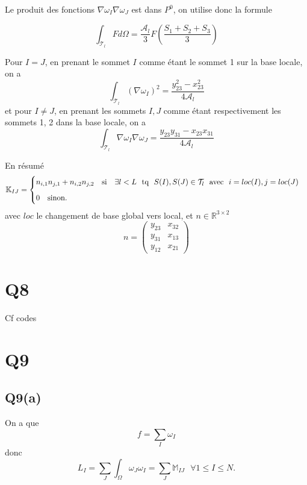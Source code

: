\documentclass[11pt]{article}
\newcommand{\A}{\mathcal{A}}
\newcommand{\R}{\mathbb{R}}
\newcommand{\K}{\mathbb{K}}
\newcommand{\M}{\mathbb{M}}
\newcommand{\ms}{~~~}
\begin{document}
Le produit des fonctions $\nabla \omega_I \nabla \omega_J$ est dans $P^0$, on utilise donc la formule

\begin{equation}
  \int_{\mathcal{T}_l} F d\Omega = \frac{\A_l}{3}F\left(\frac{S_1+S_2+S_3}{3} \right)  
\end{equation}

Pour $I=J$, en prenant le sommet $I$ comme étant le sommet 1 sur la base locale, on a
\begin{equation}
  \int_{\mathcal{T}_l} (\nabla \omega_I)^2 = \frac{y_{23}^2-x_{23}^2}{4\A_l}
\end{equation}
et pour $I\neq J$, en prenant les sommets $I, J$ comme étant respectivement les sommets 1, 2 dans la base locale, on a
\begin{equation}
  \int_{\mathcal{T}_l} \nabla \omega_I \nabla \omega_J = \frac{y_{23}y_{31}-x_{23}x_{31}}{4\A_l}
\end{equation}

En résumé
\begin{equation}
  \K_{IJ} =
  \begin{cases}
    n_{i,1}n_{j,1} + n_{i,2}n_{j,2} \ms \mbox{si} \ms \exists l < L \mbox{~~tq~~} S(I), S(J) \in \mathcal{T}_l \mbox{~~avec~~} i=loc(I), j=loc(J)\medskip\\
    0 \ms \mbox{sinon}.
  \end{cases}
\end{equation}
avec $loc$ le changement de base global vers local, et $n\in\R^{3\times 2}$
\begin{equation}
  n = \left(
  \begin{matrix}
    y_{23} & x_{32} \\
    y_{31} & x_{13} \\
    y_{12} & x_{21} 
  \end{matrix}
  \right)
\end{equation}

\section{Q8}

Cf codes

\section{Q9}
\subsection{Q9(a)}
On a que
\begin{equation}
  f = \sum_I \omega_I
\end{equation}
donc
\begin{equation}
  L_I = \sum_J \int_\Omega \omega_J \omega_I = \sum_J \M_{IJ} \ms \forall 1 \leq I \leq N. 
\end{equation}
\end{document}
